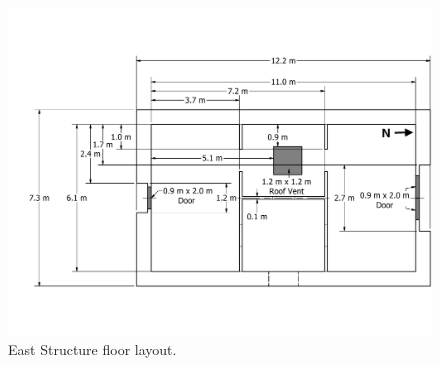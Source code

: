 \documentclass[12pt,oneside]{book}
\begin{document}
\begin{figure}[!ht]
	\includegraphics[width=\columnwidth]{../Figures/Floor_Plans/East_Structure_Dimensioned_Full}
	\caption[Dimensioned floor plan of the East Structure.]{East Structure floor layout.}
	\label{fig:east_dimensioned_plan}
\end{figure}
\end{document}
